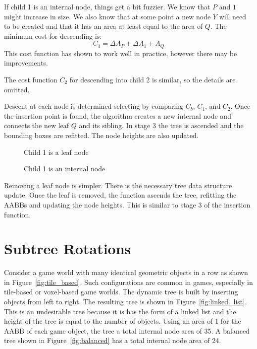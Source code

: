 \documentclass{article}
\begin{document}
If child 1 is an internal node, things get a bit fuzzier. We know that $P$ and $1$ might increase in size. We also know that at some point a new node $Y$ will need to be created and that it has an area at least equal to the area of $Q$. The minimum cost for descending is:
\[ C_1 = \Delta A_P + \Delta A_1 + A_Q \]
This cost function has shown to work well in practice, however there may be improvements.

The cost function $C_2$ for descending into child 2 is similar, so the details are omitted.

Descent at each node is determined selecting by comparing $C_b$, $C_1$, and $C_2$. Once the insertion point is found, the algorithm creates a new internal node and connects the new leaf $Q$ and its sibling. In stage 3 the tree is ascended and the bounding boxes are refitted. The node heights are also updated.

\begin{figure}
	\begin{center}
		
	\end{center}
	\caption{Child 1 is a leaf node}
	\label{fig:child1_leaf}
\end{figure}

\begin{figure}
	\begin{center}
		
	\end{center}
	\caption{Child 1 is an internal node}
	\label{fig:child1_internal}
\end{figure}

Removing a leaf node is simpler. There is the necessary tree data structure update. Once the leaf is removed, the function ascends the tree, refitting the AABBs and updating the node heights. This is similar to stage 3 of the insertion function.

\section{Subtree Rotations}

Consider a game world with many identical geometric objects in a row as shown in Figure~\ref{fig:tile_based}. Such configurations are common in games, especially in tile-based or voxel-based game worlds. The dynamic tree is built by inserting objects from left to right. The resulting tree is shown in Figure~\ref{fig:linked_list}. This is an undesirable tree because it is has the form of a linked list and the height of the tree is equal to the number of objects. Using an area of 1 for the AABB of each game object, the tree a total internal node area of 35. A balanced tree shown in Figure~\ref{fig:balanced} has a total internal node area of 24.
\end{document}
